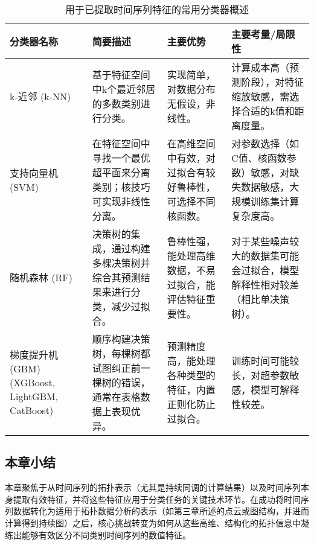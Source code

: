 \begin{table}[h!]
    \centering
    \caption{用于已提取时间序列特征的常用分类器概述}
    \label{tab:classifiers_condensed}
    \begin{tabular}{|p{2cm}|p{3.5cm}|p{4cm}|p{4.5cm}|}
        \hline
        \textbf{分类器名称}                            & \textbf{简要描述}                         & \textbf{主要优势}                 & \textbf{主要考量/局限性}                        \\
        \hline
        k-近邻 (k-NN)                               & 基于特征空间中k个最近邻居的多数类别进行分类。               & 实现简单，对数据分布无假设，非线性。            & 计算成本高（预测阶段），对特征缩放敏感，需选择合适的k值和距离度量。       \\
        \hline
        支持向量机 (SVM)                               & 在特征空间中寻找一个最优超平面来分离类别；核技巧可实现非线性分离。     & 在高维空间中有效，对过拟合有较好鲁棒性，可选择不同核函数。 & 对参数选择（如C值、核函数参数）敏感，对缺失数据敏感，大规模训练集计算复杂度高。 \\
        \hline
        随机森林 (RF)                                 & 决策树的集成，通过构建多棵决策树并综合其预测结果来进行分类，减少过拟合。  & 鲁棒性强，能处理高维数据，不易过拟合，能评估特征重要性。  & 对于某些噪声较大的数据集可能会过拟合，模型解释性相对较差（相比单决策树）。    \\
        \hline
        梯度提升机 (GBM) (XGBoost, LightGBM, CatBoost) & 顺序构建决策树，每棵树都试图纠正前一棵树的错误，通常在表格数据上表现优异。 & 预测精度高，能处理各种类型的特征，内置正则化防止过拟合。  & 训练时间可能较长，对超参数敏感，模型可解释性较差。                \\
        \hline
    \end{tabular}
\end{table}





















\subsection{本章小结}
\label{sec:ch4_summary}
本章聚焦于从时间序列的拓扑表示（尤其是持续同调的计算结果）以及时间序列本身提取有效特征，并将这些特征应用于分类任务的关键技术环节。在成功将时间序列数据转化为适用于拓扑数据分析的表示（如第三章所述的点云或图结构，并进而计算得到持续图）之后，核心挑战转变为如何从这些高维、结构化的拓扑信息中凝练出能够有效区分不同类别时间序列的数值特征。

